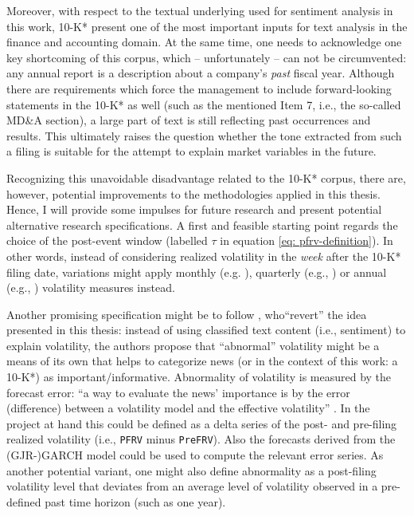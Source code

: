 Moreover, with respect to the textual underlying used for sentiment analysis in this work, 10-K* present one of the most important inputs for text analysis in the finance and accounting domain. At the same time, one needs to acknowledge one key shortcoming of this corpus, which -- unfortunately -- can not be circumvented: any annual report is a description about a company's \textit{past} fiscal year. Although there are requirements which force the management to include forward-looking statements in the 10-K* as well (such as the mentioned Item 7, i.e., the so-called MD\&A section), a large part of text is still reflecting past occurrences and results. This ultimately raises the question whether the tone extracted from such a filing is suitable for the attempt to explain market variables in the future. 

Recognizing this unavoidable disadvantage related to the 10-K* corpus, there are, however, potential improvements to the methodologies applied in this thesis. Hence, I will provide some impulses for future research and present potential alternative research specifications. A first and feasible starting point regards the choice of the post-event window (labelled $\tau$ in equation \eqref{eq: pfrv-definition}). In other words, instead of considering realized volatility in the \textit{week} after the 10-K* filing date, variations might apply monthly (e.g. \textcite{Jegadeesh2013}), quarterly (e.g., \textcite{Rekabsaz2017}) or annual (e.g., \textcite{Loughran2011}) volatility measures instead.

Another promising specification might be to follow \textcite{Nizer_BovespaVola_2012}, who\enquote{revert} the idea presented in this thesis: instead of using classified text content (i.e., sentiment) to explain volatility, the authors propose that \enquote{abnormal} volatility might be a means of its own that helps to categorize news (or in the context of this work: a 10-K*) as important/informative. Abnormality of volatility is measured by the forecast error: \enquote{a way to evaluate the news' importance is by the error (difference) between a volatility model and the effective volatility} \parencite[10675]{Nizer_BovespaVola_2012}.  In the project at hand this could be defined as a delta series of the post- and pre-filing realized volatility (i.e., \texttt{PFRV} minus \texttt{PreFRV}). Also the forecasts derived from the (GJR-)GARCH model could be used to compute the relevant error series. As another potential variant, one might also define abnormality as a post-filing volatility level that deviates from an average level of volatility observed in a pre-defined past time horizon (such as one year).

